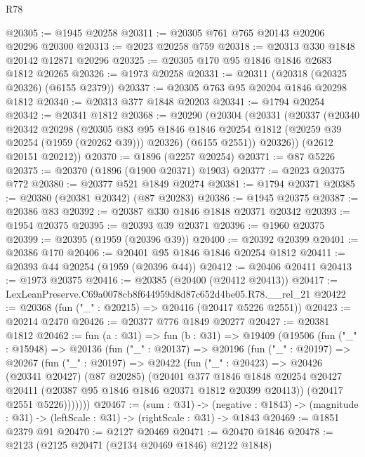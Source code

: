\begin{lexlean}{R78}
\begin{coremodule}
@20305 := @1945 @20258
@20311 := @20305 @761 @765 @20143 @20206 @20296 @20300
@20313 := @2023 @20258 @759
@20318 := @20313 @330 @1848 @20142 @12871 @20296
@20325 := @20305 @170 @95 @1846 @1846 @2683 @1812 @20265
@20326 := @1973 @20258
@20331 := @20311 (@20318 (@20325 @20326) (@6155 @2379))
@20337 := @20305 @763 @95 @20204 @1846 @20298 @1812
@20340 := @20313 @377 @1848 @20203
@20341 := @1794 @20254
@20342 := @20341 @1812
@20368 := @20290
    (@20304
      (@20331
        (@20337
          (@20340
            @20342
            @20298
            (@20305
              @83
              @95
              @1846
              @1846
              @20254
              @1812
              (@20259 @39 @20254 (@1959 (@20262 @39)))
              @20326)
            (@6155 @2551))
          @20326))
      (@2612 @20151 @20212))
@20370 := @1896 (@2257 @20254)
@20371 := @87 @5226
@20375 := @20370 (@1896 (@1900 @20371) @1903)
@20377 := @2023 @20375 @772
@20380 := @20377 @521 @1849 @20274
@20381 := @1794 @20371
@20385 := @20380 (@20381 @20342) (@87 @20283)
@20386 := @1945 @20375
@20387 := @20386 @83
@20392 := @20387 @330 @1846 @1848 @20371 @20342
@20393 := @1954 @20375
@20395 := @20393 @39 @20371
@20396 := @1960 @20375
@20399 := @20395 (@1959 (@20396 @39))
@20400 := @20392 @20399
@20401 := @20386 @170
@20406 := @20401 @95 @1846 @1846 @20254 @1812
@20411 := @20393 @44 @20254 (@1959 (@20396 @44))
@20412 := @20406 @20411
@20413 := @1973 @20375
@20416 := @20385 (@20400 (@20412 @20413))
@20417 := LexLeanPreserve.C69a0078cb8f644959d8d87c652d4be05.R78.__rel_21
@20422 := @20368 (fun ("_" : @20215) => @20416 (@20417 @5226 @2551))
@20423 := @20214 @2470
@20426 := @20377 @776 @1849 @20277
@20427 := @20381 @1812
@20462 := fun (a : @31) =>
  fun (b : @31) =>
  @19409
    (@19506
      (fun ("_" : @15948) =>
      @20136
        (fun ("_" : @20137) =>
        @20196
          (fun ("_" : @20197) =>
          @20267
            (fun ("_" : @20197) =>
            @20422
              (fun ("_" : @20423) =>
              @20426
                (@20341 @20427)
                (@87 @20285)
                (@20401
                  @377
                  @1846
                  @1848
                  @20254
                  @20427
                  @20411
                  (@20387 @95 @1846 @1846 @20371 @1812 @20399 @20413))
                (@20417 @2551 @5226)))))))
@20467 := (sum : @31) ->
  (negative : @1843) -> (magnitude : @31) -> (leftScale : @31) -> (rightScale : @31) -> @1843
@20469 := @1851 @2379 @91
@20470 := @2127 @20469
@20471 := @20470 @1846
@20478 := @2123 (@2125 @20471 (@2134 @20469 @1846) @2122 @1848)

\end{coremodule}
\end{lexlean}
